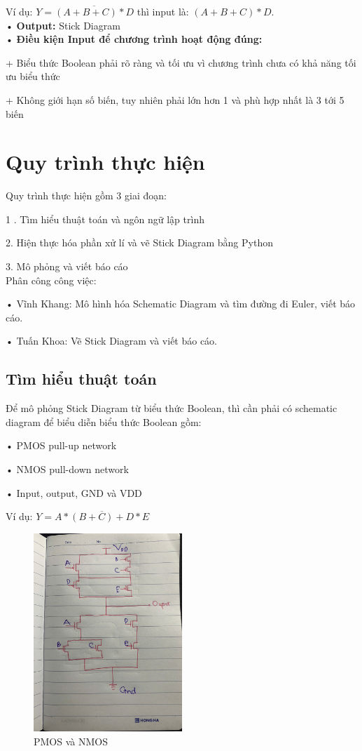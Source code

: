 \documentclass[a4paper,12pt]{article}
\begin{document}
Ví dụ: \( Y = \overline{(A + B + C) * D} \) thì input là: \( (A + B + C) * D \).\\
• \textbf{Output:} Stick Diagram\\
• \textbf{Điều kiện Input để chương trình hoạt động đúng:}

    + Biểu thức Boolean phải rõ ràng và tối ưu vì chương trình chưa có khả năng tối ưu biểu thức

    + Không giới hạn số biến, tuy nhiên phải lớn hơn 1 và phù hợp nhất là 3 tới 5 biến
\newpage
\section{Quy trình thực hiện}
Quy trình thực hiện gồm 3 giai đoạn:

1 . Tìm hiểu thuật toán và ngôn ngữ lập trình

2. Hiện thực hóa phần xử lí và vẽ Stick Diagram bằng Python

3. Mô phỏng và viết báo cáo\\
Phân công công việc:

• Vĩnh Khang: Mô hình hóa Schematic Diagram và tìm đường đi Euler, viết báo cáo.

• Tuấn Khoa: Vẽ Stick Diagram và viết báo cáo.
\subsection{Tìm hiểu thuật toán}
Để mô phỏng Stick Diagram từ biểu thức Boolean, thì cần phải có schematic diagram để biểu diễn biểu thức Boolean gồm:

• PMOS pull-up network

• NMOS pull-down network

• Input, output, GND và VDD

Ví dụ: \( Y = \overline{A *(B + C) + D * E} \)

\begin{figure}[H]
    \centering
    \includegraphics[width=0.5\textwidth]{../PNG/ViDuSchematic.jpg}
    \caption{PMOS và NMOS}
    \label{fig:PMOS_NMOS}
\end{figure}
\end{document}
